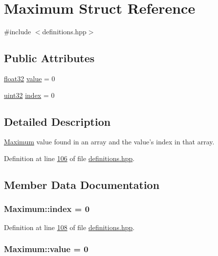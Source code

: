 \hypertarget{structMaximum}{\section{Maximum Struct Reference}
\label{structMaximum}
}


{\ttfamily \#include $<$definitions.\+hpp$>$}

\subsection*{Public Attributes}
\begin{DoxyCompactItemize}
\item 
\hyperlink{definitions_8hpp_aacdc525d6f7bddb3ae95d5c311bd06a1}{float32} \hyperlink{structMaximum_aa7e84cbf37b694670142670014366969}{value} = 0
\item 
\hyperlink{definitions_8hpp_a1134b580f8da4de94ca6b1de4d37975e}{uint32} \hyperlink{structMaximum_a2e6aef03795cd285fe542d0861c6e3b5}{index} = 0
\end{DoxyCompactItemize}


\subsection{Detailed Description}
\hyperlink{structMaximum}{Maximum} value found in an array and the value's index in that array. 

Definition at line \hyperlink{definitions_8hpp_source_l00106}{106} of file \hyperlink{definitions_8hpp_source}{definitions.\+hpp}.



\subsection{Member Data Documentation}
\hypertarget{structMaximum_a2e6aef03795cd285fe542d0861c6e3b5}{
\subsubsection[{index}]{ Maximum\+::index = 0}}\label{structMaximum_a2e6aef03795cd285fe542d0861c6e3b5}


Definition at line \hyperlink{definitions_8hpp_source_l00108}{108} of file \hyperlink{definitions_8hpp_source}{definitions.\+hpp}.

\hypertarget{structMaximum_aa7e84cbf37b694670142670014366969}{
\subsubsection[{value}]{ Maximum\+::value = 0}}\label{structMaximum_aa7e84cbf37b694670142670014366969}



